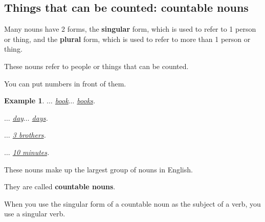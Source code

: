 \documentclass[oneside]{book}
\numberwithin{equation}{section}
\newtheorem{example}{Example}[section]
\begin{document}
\subsection{Things that can be counted: countable nouns}
\noindent{} Many nouns have 2 forms, the \textbf{singular} form, which is used to refer to 1 person or thing, and the \textbf{plural} form, which is used to refer to more than 1 person or thing.

%
These nouns refer to people or things that can be counted.

You can put numbers in front of them.
\begin{example}
    $\ldots$ \underline{book}$\ldots$ \underline{books}.
    
    $\ldots$ \underline{day}$\ldots$ \underline{days}.
    
    $\ldots$ \underline{3 brothers}.
    
    $\ldots$ \underline{10 minutes}.
\end{example}
These nouns make up the largest group of nouns in English.

They are called \textbf{countable nouns}.

%
\noindent{} When you use the singular form of a countable noun as the subject of a verb, you use a singular verb.
\end{document}
